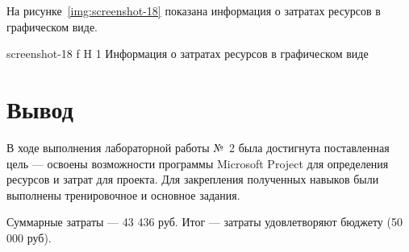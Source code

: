 \documentclass{bmstu}
\begin{document}
На рисунке~\ref{img:screenshot-18} показана информация о затратах ресурсов в графическом виде.
    
    {screenshot-18}
    {f}
    {H}
    {1\textwidth}
    {Информация о затратах ресурсов в графическом виде}

\section{Вывод}

В ходе выполнения лабораторной работы №~2 была достигнута поставленная цель --- освоены возможности программы Microsoft Project для определения ресурсов и затрат для проекта. 
Для закрепления полученных навыков были выполнены тренировочное и основное задания.

Суммарные затраты --- 43 436 руб. 
Итог --- затраты удовлетворяют бюджету (50 000 руб).
\end{document}
